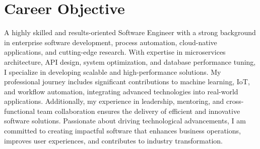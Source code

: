 \section{\textbf{Career Objective}}
A highly skilled and results-oriented Software Engineer with a strong background in enterprise software development, process automation, cloud-native applications, and cutting-edge research. With expertise in microservices architecture, API design, system optimization, and database performance tuning, I specialize in developing scalable and high-performance solutions. My professional journey includes significant contributions to machine learning, IoT, and workflow automation, integrating advanced technologies into real-world applications. Additionally, my experience in leadership, mentoring, and cross-functional team collaboration ensures the delivery of efficient and innovative software solutions. Passionate about driving technological advancements, I am committed to creating impactful software that enhances business operations, improves user experiences, and contributes to industry transformation.
